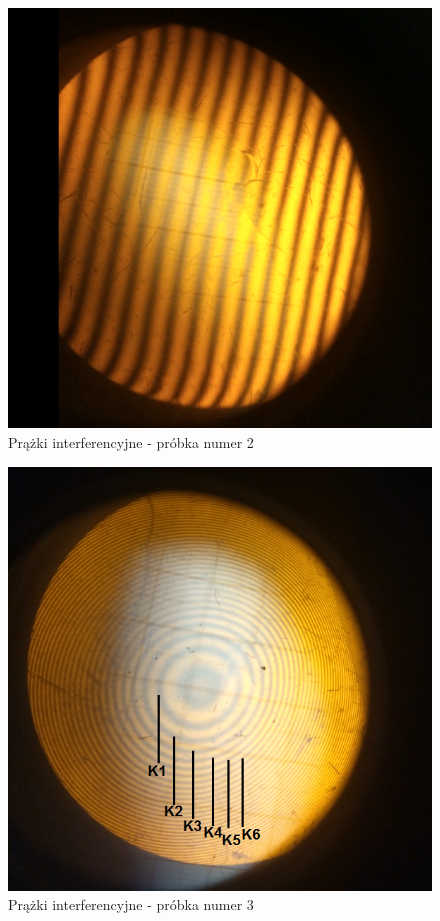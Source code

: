\documentclass[12pt, a4paper, oneside]{article}
\begin{document}
\begin{figure}[h]
\centering
\caption{Prążki interferencyjne - próbka numer 2}
\includegraphics[scale=.4129]{pics/f3.png}
\end{figure}
\begin{figure}[h]
\centering
\caption{Prążki interferencyjne - próbka numer 3}
\includegraphics[scale=.55]{pics/f4.png}
\end{figure}
\end{document}
